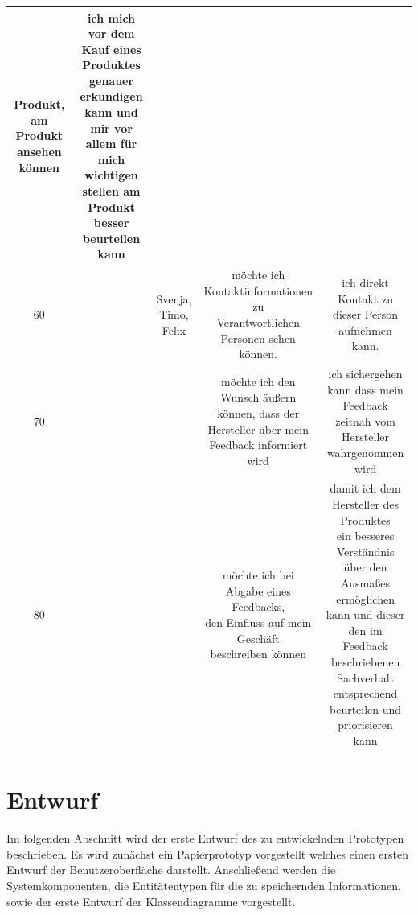 \begin{table}[H]
{\begin{tabular}{ | c | c | c |c |c |}
{			Produkt, am Produkt ansehen können} &  \makecell{ich mich vor dem Kauf eines Produktes genauer\\
			erkundigen kann und mir vor allem für mich\\
			wichtigen stellen am Produkt besser beurteilen\\
			kann
}\\
		\hline	
		60 &  \makecell{Endkunde}  & \makecell{Svenja, \\ Timo, \\ Felix} & \makecell{möchte ich Kontaktinformationen zu\\
			Verantwortlichen Personen sehen\\
			können.} &  \makecell{ich direkt Kontakt zu dieser Person aufnehmen\\
			kann.}\\
		\hline	
		70 &  \makecell{Endkunde}  & \makecell{Timo} & \makecell{möchte ich den Wunsch äußern\\
			können, dass der Hersteller über mein\\
			Feedback informiert wird} &  \makecell{ich sichergehen kann dass mein Feedback\\
			zeitnah vom Hersteller wahrgenommen wird}\\
		\hline	
		80 &  \makecell{Endkunde}  & \makecell{Timo} & \makecell{möchte ich bei Abgabe eines Feedbacks,\\ den
			Einfluss auf mein Geschäft\\
			beschreiben können} &  \makecell{damit ich dem Hersteller des Produktes\\ ein besseres Verständnis über den Ausmaßes ermöglichen\\ kann und dieser den im Feedback beschriebenen\\ Sachverhalt entsprechend beurteilen und priorisieren kann }\\
		\hline	
\end{tabular}}
\end{table}

\section{Entwurf}

Im folgenden Abschnitt wird der erste Entwurf des zu entwickelnden Prototypen beschrieben. Es wird zunächst ein Papierprototyp vorgestellt welches einen ersten Entwurf der Benutzeroberfläche darstellt. 
Anschließend werden die Systemkomponenten, die Entitätentypen für die zu speichernden Informationen, sowie der erste Entwurf der Klassendiagramme vorgestellt.  

